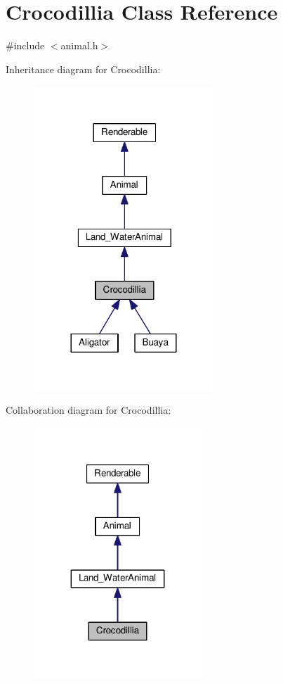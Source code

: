 \hypertarget{classCrocodillia}{}\section{Crocodillia Class Reference}
\label{classCrocodillia}


{\ttfamily \#include $<$animal.\+h$>$}



Inheritance diagram for Crocodillia\+:
\nopagebreak
\begin{figure}[H]
\begin{center}
\leavevmode
\includegraphics[width=192pt]{classCrocodillia__inherit__graph}
\end{center}
\end{figure}


Collaboration diagram for Crocodillia\+:
\nopagebreak
\begin{figure}[H]
\begin{center}
\leavevmode
\includegraphics[width=179pt]{classCrocodillia__coll__graph}
\end{center}
\end{figure}
